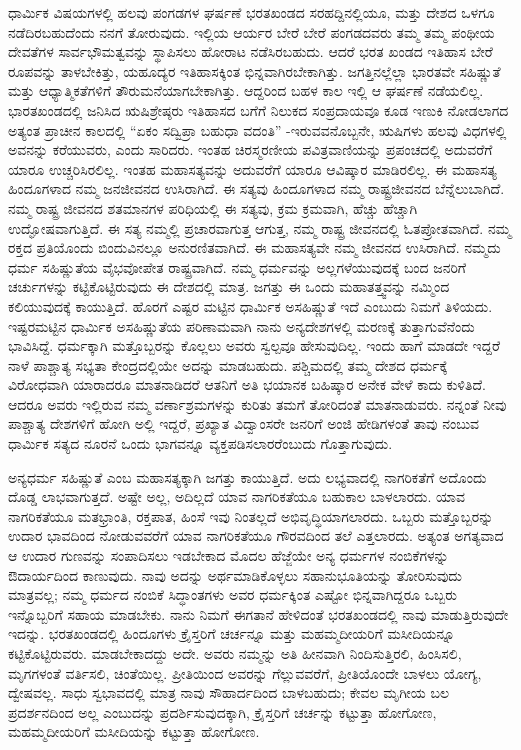 ಧಾರ್ಮಿಕ ವಿಷಯಗಳಲ್ಲಿ ಹಲವು ಪಂಗಡಗಳ ಘರ್ಷಣೆ ಭರತಖಂಡದ ಸರಹದ್ದಿನಲ್ಲಿಯೂ, ಮತ್ತು ದೇಶದ ಒಳಗೂ ನಡೆದಿರಬಹುದೆಂದು ನನಗೆ ತೋರುವುದು. ಇಲ್ಲಿಯ ಆರ್ಯರ ಬೇರೆ ಬೇರೆ ಪಂಗಡದವರು ತಮ್ಮ ತಮ್ಮ ಪಂಥೀಯ ದೇವತೆಗಳ ಸಾರ್ವಭೌಮತ್ವವನ್ನು ಸ್ಥಾಪಿಸಲು ಹೋರಾಟ ನಡೆಸಿರಬಹುದು. ಆದರೆ ಭರತ ಖಂಡದ ಇತಿಹಾಸ ಬೇರೆ ರೂಪವನ್ನು ತಾಳಬೇಕಿತ್ತು, ಯಹೂದ್ಯರ ಇತಿಹಾಸಕ್ಕಿಂತ ಭಿನ್ನವಾಗಿರಬೇಕಾಗಿತ್ತು. ಜಗತ್ತಿನಲ್ಲೆಲ್ಲಾ ಭಾರತವೇ ಸಹಿಷ್ಣುತೆ ಮತ್ತು ಆಧ್ಯಾತ್ಮಿಕತೆಗಳಿಗೆ ತೌರುಮನೆಯಾಗಬೇಕಾಗಿತ್ತು. ಆದ್ದರಿಂದ ಬಹಳ ಕಾಲ ಇಲ್ಲಿ ಆ ಘರ್ಷಣೆ ನಡೆಯಲಿಲ್ಲ. ಭಾರತಖಂಡದಲ್ಲಿ ಜನಿಸಿದ ಋಷಿಶ್ರೇಷ್ಠರು ಇತಿಹಾಸದ ಬಗೆಗೆ ನಿಲುಕದ ಸಂಪ್ರದಾಯವೂ ಕೂಡ ಇಣುಕಿ ನೋಡಲಾಗದ ಅತ್ಯಂತ ಪ್ರಾಚೀನ ಕಾಲದಲ್ಲಿ “ಏಕಂ ಸದ್ವಿಪ್ರಾ ಬಹುಧಾ ವದಂತಿ” -ಇರುವವನೊಬ್ಬನೇ, ಋಷಿಗಳು ಹಲವು ವಿಧಗಳಲ್ಲಿ ಅವನನ್ನು ಕರೆಯುವರು, ಎಂದು ಸಾರಿದರು. ಇಂತಹ ಚಿರಸ್ಮರಣೀಯ ಪವಿತ್ರವಾಣಿಯನ್ನು ಪ್ರಪಂಚದಲ್ಲಿ ಅದುವರೆಗೆ ಯಾರೂ ಉಚ್ಚರಿಸಿರಲಿಲ್ಲ. ಇಂತಹ ಮಹಾಸತ್ಯವನ್ನು ಅದುವರೆಗೆ ಯಾರೂ ಆವಿಷ್ಕಾರ ಮಾಡಿರಲಿಲ್ಲ. ಈ ಮಹಾಸತ್ಯ ಹಿಂದೂಗಳಾದ ನಮ್ಮ ಜನಜೀವನದ ಉಸಿರಾಗಿದೆ. ಈ ಸತ್ಯವು ಹಿಂದೂಗಳಾದ ನಮ್ಮ ರಾಷ್ಟ್ರಜೀವನದ ಬೆನ್ನೆಲುಬಾಗಿದೆ. ನಮ್ಮ ರಾಷ್ಟ್ರ ಜೀವನದ ಶತಮಾನಗಳ ಪರಿಧಿಯಲ್ಲಿ ಈ ಸತ್ಯವು, ಕ್ರಮ ಕ್ರಮವಾಗಿ, ಹೆಚ್ಚು ಹೆಚ್ಚಾಗಿ ಉದ್ಘೋಷವಾಗುತ್ತಿದೆ. ಈ ಸತ್ಯ ನಮ್ಮಲ್ಲಿ ಪ್ರಚಾರವಾಗುತ್ತ ಆಗುತ್ತ, ನಮ್ಮ ರಾಷ್ಟ್ರ ಜೀವನದಲ್ಲಿ ಓತಪ್ರೋತವಾಗಿದೆ. ನಮ್ಮ ರಕ್ತದ ಪ್ರತಿಯೊಂದು ಬಿಂದುವಿನಲ್ಲೂ ಅನುರಣಿತವಾಗಿದೆ. ಈ ಮಹಾಸತ್ಯವೇ ನಮ್ಮ ಜೀವನದ ಉಸಿರಾಗಿದೆ. ನಮ್ಮದು ಧರ್ಮ ಸಹಿಷ್ಣುತೆಯ ವೈಭವೋಪೇತ ರಾಷ್ಟ್ರವಾಗಿದೆ. ನಮ್ಮ ಧರ್ಮವನ್ನು ಅಲ್ಲಗಳೆಯುವುದಕ್ಕೆ ಬಂದ ಜನರಿಗೆ ಚರ್ಚುಗಳನ್ನು ಕಟ್ಟಿಕೊಟ್ಟಿರುವುದು ಈ ದೇಶದಲ್ಲಿ ಮಾತ್ರ. ಜಗತ್ತು ಈ ಒಂದು ಮಹಾತತ್ತ್ವವನ್ನು ನಮ್ಮಿಂದ ಕಲಿಯುವುದಕ್ಕೆ ಕಾಯುತ್ತಿದೆ. ಹೊರಗೆ ಎಷ್ಟರ ಮಟ್ಟಿನ ಧಾರ್ಮಿಕ ಅಸಹಿಷ್ಣುತೆ ಇದೆ ಎಂಬುದು ನಿಮಗೆ ತಿಳಿಯದು. ಇಷ್ಟರಮಟ್ಟಿನ ಧಾರ್ಮಿಕ ಅಸಹಿಷ್ಣುತೆಯ ಪರಿಣಾಮವಾಗಿ ನಾನು ಅನ್ಯದೇಶಗಳಲ್ಲಿ ಮರಣಕ್ಕೆ ತುತ್ತಾಗುವೆನೆಂದು ಭಾವಿಸಿದ್ದೆ. ಧರ್ಮಕ್ಕಾಗಿ ಮತ್ತೊಬ್ಬರನ್ನು ಕೊಲ್ಲಲು ಅವರು ಸ್ವಲ್ಪವೂ ಹೇಸುವುದಿಲ್ಲ. ಇಂದು ಹಾಗೆ ಮಾಡದೇ ಇದ್ದರೆ ನಾಳೆ ಪಾಶ್ಚಾತ್ಯ ಸಭ್ಯತಾ ಕೇಂದ್ರದಲ್ಲಿಯೇ ಅದನ್ನು ಮಾಡಬಹುದು. ಪಶ್ಚಿಮದಲ್ಲಿ ತಮ್ಮ ದೇಶದ ಧರ್ಮಕ್ಕೆ ವಿರೋಧವಾಗಿ ಯಾರಾದರೂ ಮಾತನಾಡಿದರೆ ಆತನಿಗೆ ಅತಿ ಭಯಾನಕ ಬಹಿಷ್ಕಾರ ಅನೇಕ ವೇಳೆ ಕಾದು ಕುಳಿತಿದೆ. ಆದರೂ ಅವರು ಇಲ್ಲಿರುವ ನಮ್ಮ ವರ್ಣಾಶ್ರಮಗಳನ್ನು ಕುರಿತು ತಮಗೆ ತೋರಿದಂತೆ ಮಾತನಾಡುವರು. ನನ್ನಂತೆ ನೀವು ಪಾಶ್ಚಾತ್ಯ ದೇಶಗಳಿಗೆ ಹೋಗಿ ಅಲ್ಲಿ ಇದ್ದರೆ, ಪ್ರಖ್ಯಾತ ವಿದ್ವಾಂಸರೇ ಜನರಿಗೆ ಅಂಜಿ ಹೇಡಿಗಳಂತೆ ತಾವು ನಂಬುವ ಧಾರ್ಮಿಕ ಸತ್ಯದ ನೂರನೆ ಒಂದು ಭಾಗವನ್ನೂ ವ್ಯಕ್ತಪಡಿಸಲಾರರೆಂಬುದು ಗೊತ್ತಾಗುವುದು.

ಅನ್ಯಧರ್ಮ ಸಹಿಷ್ಣುತೆ ಎಂಬ ಮಹಾಸತ್ಯಕ್ಕಾಗಿ ಜಗತ್ತು ಕಾಯುತ್ತಿದೆ. ಅದು ಲಭ್ಯವಾದಲ್ಲಿ ನಾಗರಿಕತೆಗೆ ಅದೊಂದು ದೊಡ್ಡ ಲಾಭವಾಗುತ್ತದೆ. ಅಷ್ಟೇ ಅಲ್ಲ, ಅದಿಲ್ಲದೆ ಯಾವ ನಾಗರಿಕತೆಯೂ ಬಹುಕಾಲ ಬಾಳಲಾರದು. ಯಾವ ನಾಗರಿಕತೆಯೂ ಮತಭ್ರಾಂತಿ, ರಕ್ತಪಾತ, ಹಿಂಸೆ ಇವು ನಿಂತಲ್ಲದೆ ಅಭಿವೃದ್ಧಿಯಾಗಲಾರದು. ಒಬ್ಬರು ಮತ್ತೊಬ್ಬರನ್ನು ಉದಾರ ಭಾವದಿಂದ ನೋಡುವವರೆಗೆ ಯಾವ ನಾಗರಿಕತೆಯೂ ಗೌರವದಿಂದ ತಲೆ ಎತ್ತಲಾರದು. ಅತ್ಯಂತ ಅಗತ್ಯವಾದ ಆ ಉದಾರ ಗುಣವನ್ನು ಸಂಪಾದಿಸಲು ಇಡಬೇಕಾದ ಮೊದಲ ಹೆಜ್ಜೆಯೇ ಅನ್ಯ ಧರ್ಮಗಳ ನಂಬಿಕೆಗಳನ್ನು ಔದಾರ್ಯದಿಂದ ಕಾಣುವುದು. ನಾವು ಅದನ್ನು ಅರ್ಥಮಾಡಿಕೊಳ್ಳಲು ಸಹಾನುಭೂತಿಯನ್ನು ತೋರಿಸುವುದು ಮಾತ್ರವಲ್ಲ; ನಮ್ಮ ಧರ್ಮದ ನಂಬಿಕೆ ಸಿದ್ಧಾಂತಗಳು ಅವರ ಧರ್ಮಕ್ಕಿಂತ ಎಷ್ಟೋ ಭಿನ್ನವಾಗಿದ್ದರೂ ಒಬ್ಬರು ಇನ್ನೊಬ್ಬರಿಗೆ ಸಹಾಯ ಮಾಡಬೇಕು. ನಾನು ನಿಮಗೆ ಈಗತಾನೆ ಹೇಳಿದಂತೆ ಭರತಖಂಡದಲ್ಲಿ ನಾವು ಮಾಡುತ್ತಿರುವುದೇ ಇದನ್ನು. ಭರತಖಂಡದಲ್ಲಿ ಹಿಂದೂಗಳು ಕ್ರೈಸ್ತರಿಗೆ ಚರ್ಚನ್ನೂ ಮತ್ತು ಮಹಮ್ಮದೀಯರಿಗೆ ಮಸೀದಿಯನ್ನೂ ಕಟ್ಟಿಕೊಟ್ಟಿರುವರು. ಮಾಡಬೇಕಾದದ್ದು ಅದೇ. ಅವರು ನಮ್ಮನ್ನು ಅತಿ ಹೀನವಾಗಿ ನಿಂದಿಸುತ್ತಿರಲಿ, ಹಿಂಸಿಸಲಿ, ಮೃಗಗಳಂತೆ ವರ್ತಿಸಲಿ, ಚಿಂತೆಯಿಲ್ಲ. ಪ್ರೀತಿಯಿಂದ ಅವರನ್ನು ಗೆಲ್ಲುವವರೆಗೆ, ಪ್ರೀತಿಯೊಂದೇ ಬಾಳಲು ಯೋಗ್ಯ, ದ್ವೇಷವಲ್ಲ. ಸಾಧು ಸ್ವಭಾವದಲ್ಲಿ ಮಾತ್ರ ನಾವು ಸೌಹಾರ್ದದಿಂದ ಬಾಳಬಹುದು; ಕೇವಲ ಮೃಗೀಯ ಬಲ ಪ್ರದರ್ಶನದಿಂದ ಅಲ್ಲ ಎಂಬುದನ್ನು ಪ್ರದರ್ಶಿಸುವುದಕ್ಕಾಗಿ, ಕ್ರೈಸ್ತರಿಗೆ ಚರ್ಚನ್ನು ಕಟ್ಟುತ್ತಾ ಹೋಗೋಣ, ಮಹಮ್ಮದೀಯರಿಗೆ ಮಸೀದಿಯನ್ನು ಕಟ್ಟುತ್ತಾ ಹೋಗೋಣ.

